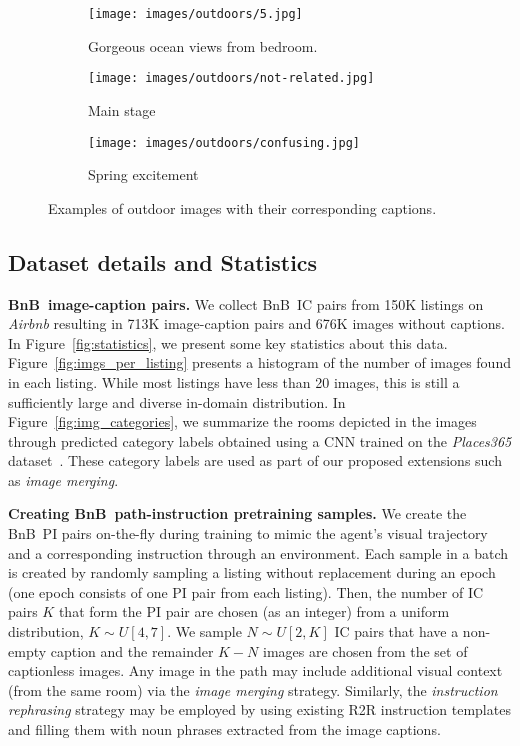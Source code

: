 \RequirePackage[dvipsnames,table]{xcolor} \documentclass[10pt,twocolumn,letterpaper]{article}
\newcommand{\p}[1]{\vspace{1mm}\noindent\textbf{#1}}
\newcommand{\airbnb}{BnB}
\begin{document}
\begin{figure*}[t]
\centering
\begin{subfigure}[b]{0.30\textwidth}
\centering 
\texttt{[image: images/outdoors/5.jpg]}
\caption{Gorgeous ocean views from {\color{red}bedroom}.}
\label{fig:view}
\end{subfigure}\quad
\begin{subfigure}[b]{0.339\textwidth}
\centering 
\texttt{[image: images/outdoors/not-related.jpg]}
\caption{Main stage}
\label{fig:festival}
\end{subfigure}\quad
\begin{subfigure}[b]{0.30\textwidth}
\centering 
\texttt{[image: images/outdoors/confusing.jpg]}
\caption{Spring excitement}
\label{fig:confusing}
\end{subfigure}
\caption{Examples of outdoor images with their corresponding captions.}
\label{fig:outdoor}
\end{figure*}



\subsection{Dataset details and Statistics}

\p{\airbnb~image-caption pairs.}
We collect \airbnb~IC pairs from 150K listings on \emph{Airbnb} resulting in 713K image-caption pairs and 676K images without captions.
In Figure~\ref{fig:statistics}, we present some key statistics about this data.
Figure~\ref{fig:imgs_per_listing} presents a histogram of the number of images found in each listing.
While most listings have less than 20 images, this is still a sufficiently large and diverse in-domain distribution.
In Figure~\ref{fig:img_categories}, we summarize the rooms depicted in the images through predicted category labels obtained using a CNN trained on the \emph{Places365} dataset~\cite{zhou2017places}.
These category labels are used as part of our proposed extensions such as \emph{image merging}.


\p{Creating \airbnb~path-instruction pretraining samples.}
We create the \airbnb~PI pairs on-the-fly during training to mimic the agent's visual trajectory and a corresponding instruction through an environment.
Each sample in a batch is created by randomly sampling a listing without replacement during an epoch (one epoch consists of one PI pair from each listing).
Then, the number of IC pairs $K$ that form the PI pair are chosen (as an integer) from a uniform distribution, $K \sim U[4, 7]$.
We sample $N \sim U[2, K]$ IC pairs that have a non-empty caption and the remainder $K-N$ images are chosen from the set of captionless images.
Any image in the path may include additional visual context (from the same room) via the \emph{image merging} strategy.
Similarly, the \emph{instruction rephrasing} strategy may be employed by using existing R2R instruction templates and filling them with noun phrases extracted from the image captions.
\end{document}
